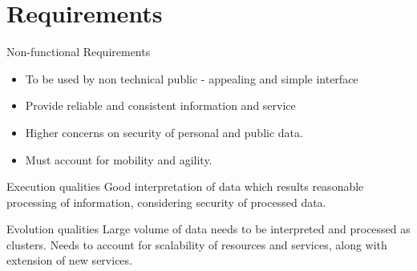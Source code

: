 \documentclass{beamer}
\begin{document}

\section{Requirements}
\begin{frame}{Non-functional Requirements}
    \begin{itemize}
        \item To be used by non technical public - appealing and simple interface
        \item Provide reliable and consistent information and service
        \item Higher concerns on security of personal and public data.
        \item Must account for mobility and agility.
    \end{itemize}
    
    \begin{block}{Execution qualities}
        Good interpretation of data which results reasonable processing of information, considering security of processed data.
    \end{block}

    \begin{block}{Evolution qualities}
        Large volume of data needs to be interpreted and processed as clusters. Needs to account for scalability of resources and services, along with extension of new services.
    \end{block}
\end{frame}
\end{document}
